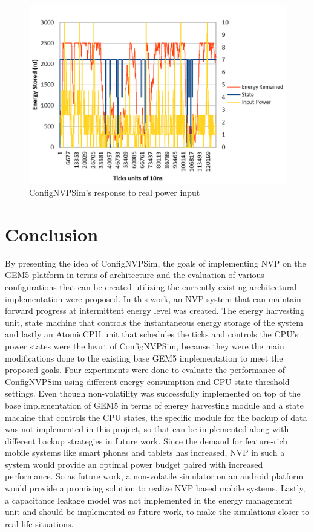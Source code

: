 \documentclass[conference]{IEEEtran}
\begin{document}
\begin{figure}[htbp]
\centerline{\includegraphics[scale=0.3]{orig3.png}}
\caption{ConfigNVPSim's response to real power input}
\label{fig:real}
\end{figure}

\section*{\textbf{Conclusion}}
By presenting the idea of ConfigNVPSim, the goals of implementing NVP on the GEM5 platform in terms of architecture and the evaluation of various configurations that can be created utilizing the currently existing architectural implementation were proposed. In this work, an NVP system that can maintain forward progress at intermittent energy level was created. The energy harvesting unit, state machine that controls the instantaneous energy storage of the system and lastly an AtomicCPU unit that schedules the ticks and controls the CPU's power states were the heart of ConfigNVPSim, because they were the main modifications done to the existing base GEM5 implementation to meet the proposed goals. Four experiments were done to evaluate the performance of ConfigNVPSim using different energy consumption and CPU state threshold settings. 
Even though non-volatility was successfully implemented on top of the base implementation of GEM5 in terms of energy harvesting module and a state machine that controls the CPU states, the specific module for the backup of data was not implemented in this project, so that can be implemented along with different backup strategies in future work. Since the demand for feature-rich mobile systems like smart phones and tablets has increased, NVP in such a system would provide an optimal power budget paired with increased performance. So as future work, a non-volatile simulator on an android platform would provide a promising solution to realize NVP based mobile systems. Lastly, a capacitance leakage model was not implemented in the energy management unit and should be implemented as future work, to make the simulations closer to real life situations. 
\end{document}
